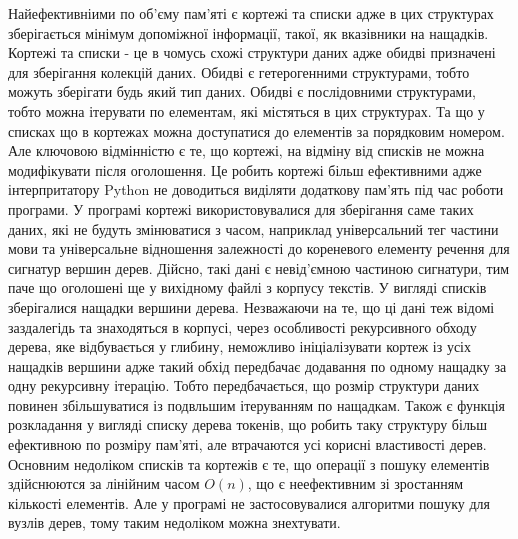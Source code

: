 Найефективніими по об'єму пам'яті є кортежі та списки адже в цих структурах зберігається
мінімум допоміжної інформації, такої, як вказівники на нащадків. Кортежі та списки - це
в чомусь схожі структури даних адже обидві призначені для зберігання колекцій даних.
Обидві є гетерогенними структурами, тобто можуть зберігати будь який тип даних.
Обидві є послідовними структурами, тобто можна ітерувати по елементам, які містяться в
цих структурах. Та що у списках що в кортежах можна доступатися до елементів за порядковим
номером. Але ключовою відмінністю є те, що кортежі, на відміну від списків не можна
модифікувати після оголошення. Це робить кортежі більш ефективними адже інтерпритатору
Python не доводиться виділяти додаткову пам'ять під час роботи програми.
У програмі кортежі використовувалися для зберігання саме таких даних, які не будуть
змінюватися з часом, наприклад універсальний тег частини мови та
універсальне відношення залежності до кореневого елементу речення для сигнатур
вершин дерев. Дійсно, такі дані є невід'ємною частиною сигнатури, тим паче що
оголошені ще у вихідному файлі з корпусу текстів. У вигляді списків зберігалися
нащадки вершини дерева. Незважаючи на те, що ці дані теж відомі заздалегідь та
знаходяться в корпусі, через особливості рекурсивного обходу дерева, яке відбувається
у глибину, неможливо ініціалізувати кортеж із усіх нащадків вершини адже
такий обхід передбачає додавання по одному нащадку за одну рекурсивну ітерацію.
Тобто передбачається, що розмір структури даних повинен збільшуватися із подвльшим
ітеруванням по нащадкам. Також є функція розкладання у вигляді списку дерева токенів,
що робить таку структуру більш ефективною по розміру пам'яті, але втрачаются усі
корисні властивості дерев. Основним недоліком списків та кортежів є те, що операції
з пошуку елементів здійснюются за лінійним часом $O(n)$, що є неефективним зі
зростанням кількості елементів. Але у програмі не застосовувалися алгоритми
пошуку для вузлів дерев, тому таким недоліком можна знехтувати.


